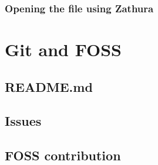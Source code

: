 \documentclass[12pt]{article}
\begin{document}
        \subsubsection*{Opening the file using Zathura}

\section*{Git and FOSS}
    \subsection*{README.md}
    \subsection*{Issues}
    \subsection*{FOSS contribution}
\end{document}
